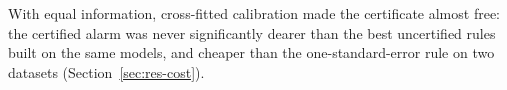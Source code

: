 With equal information, cross-fitted calibration made the certificate almost free: the certified alarm was never significantly dearer than the best uncertified rules built on the same models, and cheaper than the one-standard-error rule on two datasets (Section~\ref{sec:res-cost}).
